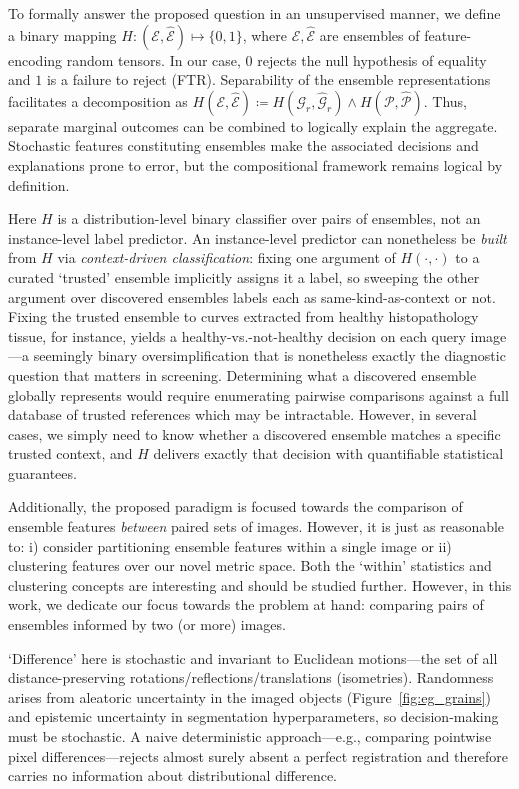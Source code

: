 \documentclass[pdflatex,iicol]{sn-jnl}%
\theoremstyle{thmstyleone}%
\theoremstyle{thmstyletwo}%
\theoremstyle{thmstylethree}%
\begin{document}
To formally answer the proposed question in an unsupervised manner, we define a binary mapping $H: (\mathcal{E}, \widehat{\mathcal{E}}) \mapsto \lbrace 0, 1\rbrace$, where $\mathcal{E},\widehat{\mathcal{E}}$ are ensembles of feature-encoding random tensors. In our case, $0$ rejects the null hypothesis of equality and $1$ is a failure to reject (FTR). Separability of the ensemble representations facilitates a decomposition as $H(\mathcal{E},\widehat{\mathcal{E}})\coloneqq H(\mathcal{G}_r,\widehat{\mathcal{G}}_r)\wedge H(\mathcal{P},\widehat{\mathcal{P}})$. Thus, separate marginal outcomes can be combined to logically explain the aggregate. Stochastic features constituting ensembles make the associated decisions and explanations prone to error, but the compositional framework remains logical by definition.

Here $H$ is a distribution-level binary classifier over pairs of ensembles, not an instance-level label predictor. An instance-level predictor can nonetheless be \emph{built} from $H$ via \textit{context-driven classification}: fixing one argument of $H(\cdot,\cdot)$ to a curated `trusted' ensemble implicitly assigns it a label, so sweeping the other argument over discovered ensembles labels each as same-kind-as-context or not. Fixing the trusted ensemble to curves extracted from healthy histopathology tissue, for instance, yields a healthy-vs.-not-healthy decision on each query image---a seemingly binary oversimplification that is nonetheless exactly the diagnostic question that matters in screening. Determining what a discovered ensemble globally represents would require enumerating pairwise comparisons against a full database of trusted references which may be intractable. However, in several cases, we simply need to know whether a discovered ensemble matches a specific trusted context, and $H$ delivers exactly that decision with quantifiable statistical guarantees.

Additionally, the proposed paradigm is focused towards the comparison of ensemble features \textit{between} paired sets of images. However, it is just as reasonable to: i) consider partitioning ensemble features within a single image or ii) clustering features over our novel metric space. Both the `within' statistics and clustering concepts are interesting and should be studied further. However, in this work, we dedicate our focus towards the problem at hand: comparing pairs of ensembles informed by two (or more) images.

`Difference' here is stochastic and invariant to Euclidean motions---the set of all distance-preserving rotations/reflections/translations (isometries). Randomness arises from aleatoric uncertainty in the imaged objects (Figure~\ref{fig:eg_grains}) and epistemic uncertainty in segmentation hyperparameters, so decision-making must be stochastic. A naive deterministic approach---e.g., comparing pointwise pixel differences---rejects almost surely absent a perfect registration and therefore carries no information about distributional difference.
\end{document}
